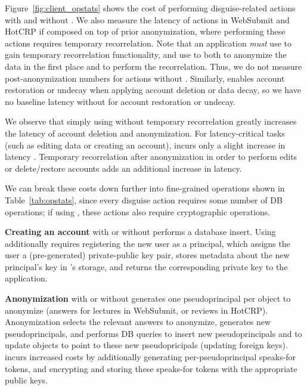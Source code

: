 %
%
Figure~\ref{fig:client_opstats} shows the cost of performing disguise-related actions with and
without \sys. We also measure the latency of actions in WebSubmit and HotCRP if composed on top of
prior anonymization, where performing these actions requires temporary recorrelation. Note that an
application \emph{must} use \sys to gain temporary recorrelation functionality, and use \sys to both
to anonymize the data in the first place and to perform the recorrelation. Thus, we do not measure
post-anonymization numbers for actions without \sys. Similarly, \sys enables account restoration or
undecay when applying account deletion or data decay, so we have no baseline latency without \sys
for account restoration or undecay.

We observe that simply using \sys without temporary recorrelation greatly increases the latency of
account deletion and anonymization.  For latency-critical tasks (such as editing data or creating an
account), \sys incurs only a slight increase in latency . Temporary recorrelation
after anonymization in order to perform edits or delete/restore accounts adds an additional
 increase in latency.

We can break these costs down further into fine-grained operations shown in 
Table~\ref{tab:opstats}, since every disguise action requires some number of DB operations; if using
\sys, these actions also require cryptographic operations.

\textbf{Creating an account} with or without \sys performs a database insert. Using \sys additionally
requires registering the new user as a principal, which assigns the user a (pre-generated)
private-public key pair, stores metadata about the new principal's key in \sys's storage, and
returns the corresponding private key to the application.

\textbf{Anonymization} with or without \sys generates one pseudoprincipal per object to anonymize
(\eg answers for lectures in WebSubmit, or reviews in HotCRP). Anonymization selects the relevant answers
to anonymize, generates new pseudoprincipals, and performs DB queries to insert new pseudoprincipals
and to update objects to point to these new pseudopricipals (\eg updating foreign keys).
\sys incurs increased costs by additionally generating per-pseudoprincipal speaks-for tokens, and 
encrypting and storing these speaks-for tokens with the appropriate public keys.

